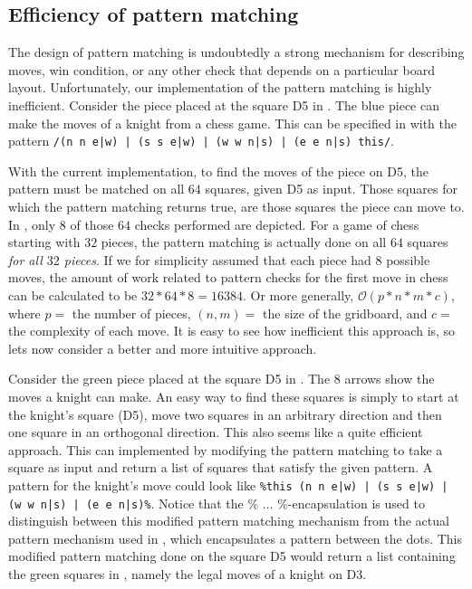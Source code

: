 \subsection{Efficiency of pattern matching}
\label{sec:patternmatchingefficiency}
The design of pattern matching is undoubtedly a strong mechanism for
describing moves, win condition, or any other check that depends on
a particular board layout. Unfortunately, our implementation of the
pattern matching is highly inefficient. Consider the piece placed at
the square D5 in . The blue piece can
make the moves of a knight from a chess game. This can be specified in
\productname{} with the pattern \texttt{/(n n e|w) | (s s e|w) | (w w
n|s) | (e e n|s) this/}.


With the current implementation, to find the moves of the piece on D5,
the pattern must be matched on all $64$ squares, given D5 as input.
Those squares for which the pattern matching returns true, are those
squares the piece can move to. In , only
$8$ of those $64$ checks performed are depicted. For a game of chess
starting with $32$ pieces, the pattern matching is actually done on all
$64$ squares \textit{for all $32$ pieces}. If we for simplicity assumed
that each piece had $8$ possible moves, the amount of work related to
pattern checks for the first move in chess can be calculated to be $32
* 64 * 8 = \num{16384}$. Or more generally, $\mathcal{O}(p * n * m *
c)$, where $p = $ the number of pieces, $(n, m) = $ the size of the
gridboard, and $c = $ the complexity of each move. It is easy to see how
inefficient this approach is, so lets now consider a better and more
intuitive approach.

Consider the green piece placed at the square D5 in
. The $8$ arrows show the moves a knight
can make. An easy way to find these squares is simply to start at
the knight's square (D5), move two squares in an arbitrary direction
and then one square in an orthogonal direction. This also seems
like a quite efficient approach. This can implemented by modifying
the pattern matching to take a square as input and return a list of
squares that satisfy the given pattern. A pattern for the knight's move
could look like \texttt{\%this (n n e|w) | (s s e|w) | (w w n|s) | (e
e n|s)\%}. Notice that the \% $\ldots$ \%-encapsulation is used to
distinguish between this modified pattern matching mechanism from the
actual pattern mechanism used in \productname{}, which encapsulates
a pattern between the dots. This modified pattern matching done
on the square D5 would return a list containing the green squares in
, namely the legal moves of a knight on
D3.

